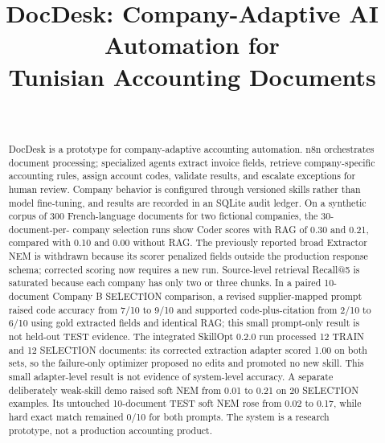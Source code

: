 \documentclass[journal,10pt,twoside]{IEEEtran}
\begin{document}
\title{DocDesk: Company-Adaptive AI Automation for\\
       Tunisian Accounting Documents}

\author{%
  \\
}

\maketitle

\begin{abstract}
DocDesk is a prototype for company-adaptive accounting automation. n8n
orchestrates document processing; specialized agents extract invoice fields,
retrieve company-specific accounting rules, assign account codes, validate
results, and escalate exceptions for human review. Company behavior is
configured through versioned skills rather than model fine-tuning, and results
are recorded in an SQLite audit ledger. On a synthetic corpus of 300
French-language documents for two fictional companies, the 30-document-per-
company selection runs show Coder scores with RAG of 0.30 and 0.21, compared
with 0.10 and 0.00 without RAG. The previously reported broad Extractor NEM is
withdrawn because its scorer penalized fields outside the production response
schema; corrected scoring now requires a new run. Source-level retrieval Recall@5 is saturated because each company has only
two or three chunks. In a paired 10-document Company B SELECTION comparison,
a revised supplier-mapped prompt raised code accuracy from 7/10 to 9/10 and
supported code-plus-citation from 2/10 to 6/10 using gold extracted fields and
identical RAG; this small prompt-only result is not held-out TEST evidence. The
integrated SkillOpt 0.2.0 run processed
12 TRAIN and 12 SELECTION documents: its corrected extraction adapter scored
1.00 on both sets, so the failure-only optimizer proposed no edits and promoted
no new skill. This small adapter-level result is not evidence of system-level
accuracy. A separate deliberately weak-skill demo raised soft NEM from 0.01 to
0.21 on 20 SELECTION examples. Its untouched 10-document TEST soft NEM rose
from 0.02 to 0.17, while hard exact match remained 0/10 for both prompts. The
system is a research
prototype, not a production accounting product.
\end{abstract}
\end{document}
